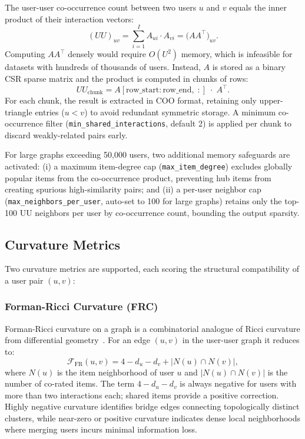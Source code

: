 The user-user co-occurrence count between two users $u$ and $v$ equals the inner product of their interaction vectors:
\begin{equation}
    (UU)_{uv} = \sum_{i=1}^{I} A_{ui} \cdot A_{vi} = \bigl(A A^\top\bigr)_{uv}.
\end{equation}
Computing $A A^\top$ densely would require $O(U^2)$ memory, which is infeasible for datasets with hundreds of thousands of users. Instead, $A$ is stored as a binary CSR sparse matrix and the product is computed in chunks of rows:
\begin{equation}
    UU_{\text{chunk}} = A[\text{row\_start}:\text{row\_end},\;:]\; \cdot\; A^\top.
\end{equation}
For each chunk, the result is extracted in COO format, retaining only upper-triangle entries ($u < v$) to avoid redundant symmetric storage. A minimum co-occurrence filter (\texttt{min\_shared\_interactions}, default 2) is applied per chunk to discard weakly-related pairs early.

For large graphs exceeding 50,000 users, two additional memory safeguards are activated: (i) a maximum item-degree cap (\texttt{max\_item\_degree}) excludes globally popular items from the co-occurrence product, preventing hub items from creating spurious high-similarity pairs; and (ii) a per-user neighbor cap (\texttt{max\_neighbors\_per\_user}, auto-set to 100 for large graphs) retains only the top-100 UU neighbors per user by co-occurrence count, bounding the output sparsity.

\subsection{Curvature Metrics}
\label{sec:curvature}

Two curvature metrics are supported, each scoring the structural compatibility of a user pair $(u,v)$:

\subsubsection*{Forman-Ricci Curvature (FRC)}

Forman-Ricci curvature on a graph is a combinatorial analogue of Ricci curvature from differential geometry~\cite{forman2003bochner}. For an edge $(u,v)$ in the user-user graph it reduces to:
\begin{equation}
    \mathcal{F}_{\text{FR}}(u,v) = 4 - d_u - d_v + \bigl|N(u) \cap N(v)\bigr|,
    \label{eq:forman_ricci}
\end{equation}
where $N(u)$ is the item neighborhood of user $u$ and $|N(u) \cap N(v)|$ is the number of co-rated items. The term $4 - d_u - d_v$ is always negative for users with more than two interactions each; shared items provide a positive correction. Highly negative curvature identifies bridge edges connecting topologically distinct clusters, while near-zero or positive curvature indicates dense local neighborhoods where merging users incurs minimal information loss.

